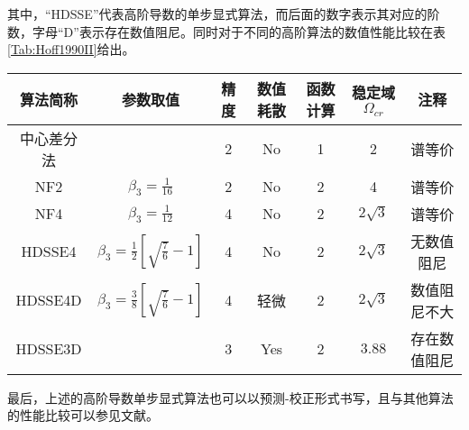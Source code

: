 其中，“HDSSE”代表高阶导数的单步显式算法，而后面的数字表示其对应的阶数，字母“D”表示存在数值阻尼。同时对于不同的高阶算法的数值性能比较在表\ref{Tab:Hoff1990II}给出。
\vspace{-0.4cm}
\begin{table}[htbp]
\vspace{0.5em}\centering\wuhao
\begin{tabular}{ccccccc}
\toprule[1.5pt]
算法简称& 参数取值 & 精度 & 数值耗散 & 函数计算 & 稳定域$\Omega_{cr}$ & 注释 \\
\midrule[1pt]
中心差分法 &  & 2 & No & 1 & 2 & 谱等价\\
NF2 & $\beta_3=\frac{1}{16}$ & 2 & No & 2 & 4 & 谱等价\\
NF4 & $\beta_3=\frac{1}{12}$ & 4 & No & 2 & $2\sqrt{3}$ & 谱等价\\
HDSSE4 & $\beta_3=\frac12[\sqrt{\frac{7}{6}}-1]$ & 4 & No & 2 & $2\sqrt{3}$ & 无数值阻尼\\
HDSSE4D & $\beta_3=\frac38[\sqrt{\frac{7}{6}}-1]$ & 4 & 轻微 & 2 & $2\sqrt{3}$ & 数值阻尼不大\\
HDSSE3D &  & 3 & Yes & 2 & $3.88$ & 存在数值阻尼\\
\bottomrule[1.5pt]
\end{tabular}
\end{table}

最后，上述的高阶导数单步显式算法也可以以预测-校正形式书写，且与其他算法的性能比较可以参见文献。

